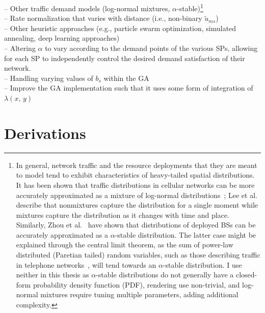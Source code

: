\documentclass[12pt,dvipsnames]{report}
\begin{document}
\noindent -- Other traffic demand models (log-normal mixtures, $\alpha$-stable)\footnote{In general, network traffic and the resource deployments that they are meant to model tend to exhibit characteristics of heavy-tailed spatial distributions.  It has been shown that traffic distributions in cellular networks can be more accurately approximated as a mixture of log-normal distributions~\cite{5936263, 6757900}; Lee et al.~\cite{6757900} describe that nonmixtures capture the distribution for a single moment while mixtures capture the distribution as it changes with time and place.  Similarly, Zhou et al.~\cite{7202841} have shown that distributions of deployed BSs can be accurately approximated as a $\alpha$-stable distribution.  The latter case might be explained through the central limit theorem, as the sum of power-law distributed (Paretian tailed) random variables, such as those describing traffic in telephone networks~\cite{PhysRevE.72.026116}, will tend towards an $\alpha$-stable distribution.  I use neither in this thesis as $\alpha$-stable distributions do not generally have a closed-form probability density function (PDF), rendering use non-trivial, and log-normal mixtures require tuning multiple parameters, adding additional complexity.}\\%
-- Rate normalization that varies with distance (i.e., non-binary $\tilde{u}_{ms}$)\\%
-- Other heuristic approaches (e.g., particle swarm optimization, simulated annealing, deep learning approaches)\\%
--  Altering $\alpha$ to vary according to the demand points of the various SPs, allowing for each SP to independently control the desired demand satisfaction of their network.\\%
-- Handling varying values of $b_s$ within the GA\\%
-- Improve the GA implementation such that it uses some form of integration of $\lambda\left( x,\, y \right)$
\fi

\iffalse
\pagebreak
\chapter{Derivations} \label{ch:derive}
\end{document}
